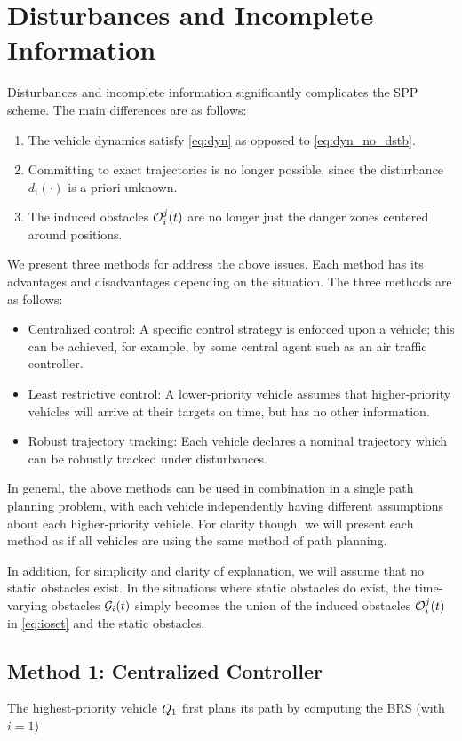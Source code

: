 \section{Disturbances and Incomplete Information \label{sec:obs_gen}}
Disturbances and incomplete information significantly complicates the SPP scheme. The main differences are as follows:

\begin{enumerate}
\item The vehicle dynamics satisfy \eqref{eq:dyn} as opposed to \eqref{eq:dyn_no_dstb}.
\item Committing to exact trajectories is no longer possible, since the disturbance $d_i(\cdot)$ is a priori unknown.
\item The induced obstacles $\mathcal{O}_i^j(t)$ are no longer just the danger zones centered around positions.
\end{enumerate}

We present three methods for address the above issues. Each method has its advantages and disadvantages depending on the situation. The three methods are as follows:
\begin{itemize}
\item Centralized control: A specific control strategy is enforced upon a vehicle; this can be achieved, for example, by some central agent such as an air traffic controller.
\item Least restrictive control: A lower-priority vehicle assumes that higher-priority vehicles will arrive at their targets on time, but has no other information.
\item Robust trajectory tracking: Each vehicle declares a nominal trajectory which can be robustly tracked under disturbances.
\end{itemize}

In general, the above methods can be used in combination in a single path planning problem, with each vehicle independently having different assumptions about each higher-priority vehicle. For clarity though, we will present each method as if all vehicles are using the same method of path planning.

In addition, for simplicity and clarity of explanation, we will assume that no static obstacles exist. In the situations where static obstacles do exist, the time-varying obstacles $\mathcal{G}_i(t)$ simply becomes the union of the induced obstacles $\mathcal{O}_i^j(t)$ in \eqref{eq:ioset} and the static obstacles.

\subsection{Method 1: Centralized Controller \label{sec:cc}}
The highest-priority vehicle $Q_1$ first plans its path by computing the BRS (with $i=1$)

